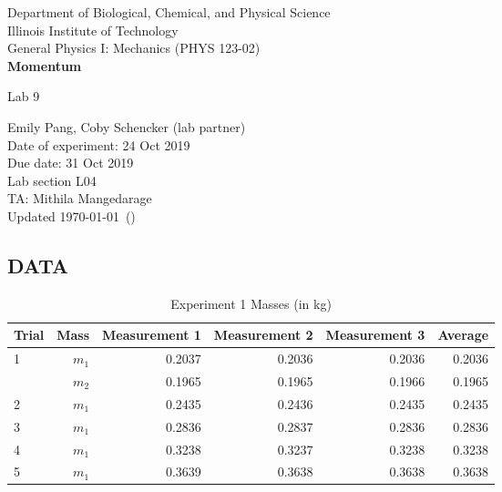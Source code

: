 \documentclass [12pt, letterpaper, twoside] {article}
\begin{document}
\begin {titlepage}
\begin {center}
Department of Biological, Chemical, and Physical Science\\
\vspace {0.1cm}
Illinois Institute of Technology\\
\vspace {0.1cm}
General Physics I: Mechanics (PHYS 123-02)\\
\vspace* {\fill}
\begingroup
\Large
\textbf {Momentum}
\vspace {0.35cm}

\normalsize
Lab 9
\vspace {1.5cm}
\endgroup
\vspace* {\fill}
\end {center}

\vspace*{\fill}
\begin {flushright}
\footnotesize
Emily Pang, Coby Schencker (lab partner)\\
Date of experiment: 24 Oct 2019\\
Due date: 31 Oct 2019\\
Lab section L04\\
TA: Mithila Mangedarage\\
Updated \usdate\today~(\currenttime)
\end {flushright}
\end {titlepage}

\subsection* {DATA}
  \begin {table}[h]
    \centering
    \begin {tabular} {| l | r | r | r | r | r |}
      \hline\hline
      Trial & Mass & Measurement 1 & Measurement 2 & Measurement 3 & Average \\
      \hline
      \multirow {2}{*}{1} & \(m_{1}\) & 0.2037 & 0.2036 & 0.2036 & 0.2036 \\ %
      & \(m_{2}\) & 0.1965 & 0.1965 & 0.1966 & 0.1965 \\ %
      \hline
      2 & \(m_{1}\) & 0.2435 & 0.2436 & 0.2435 & 0.2435 \\ %
      \hline
      3 & \(m_{1}\) & 0.2836 & 0.2837 & 0.2836 & 0.2836 \\ %
      \hline
      4 & \(m_{1}\) & 0.3238 & 0.3237 & 0.3238 & 0.3238 \\ %
      \hline
      5 & \(m_{1}\) & 0.3639 & 0.3638 & 0.3638 & 0.3638 \\ %
      \hline\hline
    \end {tabular}
    \caption {Experiment 1 Masses (in kg)}
  \end {table}
\end{document}
